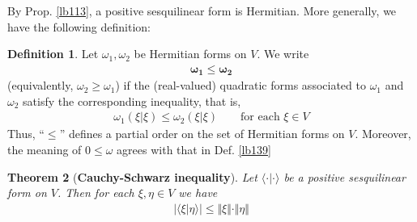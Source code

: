 \documentclass[12pt,b5paper,notitlepage]{article}
\theoremstyle{definition}
\newtheorem{df}{Definition}[subsection]
\theoremstyle{plain}
\newtheorem{thm}[df]{Theorem}
\newcommand{\bk}[1]{\langle {#1}\rangle}
\numberwithin{equation}{section}
\begin{document}
By Prop. \ref{lb113}, a positive sesquilinear form is Hermitian. More generally, we have the following definition:

\begin{df}\label{lb140}
Let $\omega_1,\omega_2$ be Hermitian forms on $V$. We write
\begin{align*}
\pmb{\omega_1\leq\omega_2}
\end{align*}
(equivalently, $\omega_2\geq\omega_1$) if the (real-valued) quadratic forms associated to $\omega_1$ and $\omega_2$ satisfy the corresponding inequality, that is,
\begin{align*}
\omega_1(\xi|\xi)\leq\omega_2(\xi|\xi)\qquad\text{for each }\xi\in V
\end{align*}
Thus, ``$\leq$'' defines a partial order on the set of Hermitian forms on $V$. Moreover, the meaning of $0\leq\omega$ agrees with that in Def. \ref{lb139}
\end{df}




\begin{thm}[\textbf{Cauchy-Schwarz inequality}] \label{lb165}
Let $\bk{\cdot|\cdot}$ be a positive sesquilinear form on $V$. Then for each $\xi,\eta\in V$ we have
\begin{align*}
|\bk{\xi|\eta}|\leq\Vert \xi\Vert\cdot\Vert \eta\Vert
\end{align*}
\end{thm}
\end{document}
